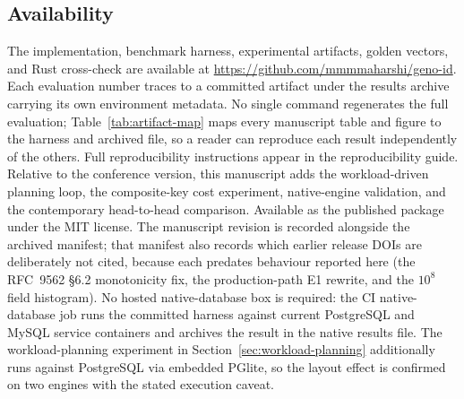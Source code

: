 \documentclass{svproc}
\begin{document}
\subsection*{Availability}
The implementation, benchmark harness, experimental artifacts, golden vectors, and Rust cross-check are available at \url{https://github.com/mmmmaharshi/geno-id}. Each evaluation number traces to a committed artifact under the results archive carrying its own environment metadata. No single command regenerates the full evaluation; Table~\ref{tab:artifact-map} maps every manuscript table and figure to the harness and archived file, so a reader can reproduce each result independently of the others. Full reproducibility instructions appear in the reproducibility guide. Relative to the conference version, this manuscript adds the workload-driven planning loop, the composite-key cost experiment, native-engine validation, and the contemporary head-to-head comparison. Available as the published package under the MIT license. The manuscript revision is recorded alongside the archived manifest; that manifest also records which earlier release DOIs are deliberately not cited, because each predates behaviour reported here (the RFC~9562 \S6.2 monotonicity fix, the production-path E1 rewrite, and the $10^8$ field histogram). No hosted native-database box is required: the CI native-database job runs the committed harness against current PostgreSQL and MySQL service containers and archives the result in the native results file. The workload-planning experiment in Section~\ref{sec:workload-planning} additionally runs against PostgreSQL via embedded PGlite, so the layout effect is confirmed on two engines with the stated execution caveat.
\end{document}
